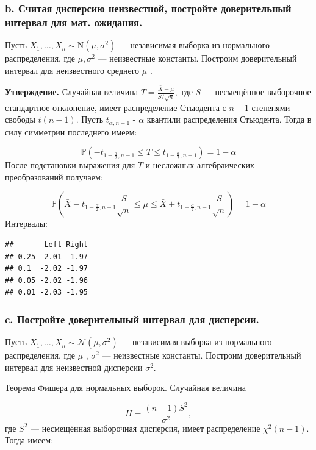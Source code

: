 \documentclass[]{article}
\begin{document}
\subsubsection{b. Считая дисперсию неизвестной, постройте доверительный
интервал для мат. ожидания.}\label{b.--------.-.}

Пусть \(X_{1},\ldots ,X_{n}\sim \mathrm {N} (\mu ,\sigma ^{2})\) ---
независимая выборка из нормального распределения, где
\(\mu ,\sigma ^{2}\) --- неизвестные константы. Построим доверительный
интервал для неизвестного среднего \(\mu\) .

\textbf{Утверждение.} Случайная величина
\(T={\frac {{\bar {X}}-\mu }{S/{\sqrt {n}}}},\) где \(S\) ---
несмещённое выборочное стандартное отклонение, имеет распределение
Стьюдента с \(n-1\) степенями свободы \(t(n-1)\). Пусть
\({\displaystyle t_{\alpha ,n-1}}\) - \({\displaystyle \alpha }\)
квантили распределения Стьюдента. Тогда в силу симметрии последнего
имеем:

\[\mathbb {P} \left(-t_{1-{\frac {\alpha }{2}},n-1}\leq T\leq t_{1-{\frac {\alpha }{2}},n-1}\right)=1-\alpha \]
После подстановки выражения для \(T\) и несложных алгебраических
преобразований получаем:

\[\mathbb {P} \left({\bar {X}}-t_{1-{\frac {\alpha }{2}},n-1}{\frac {S}{\sqrt {n}}}\leq \mu \leq {\bar {X}}+t_{1-{\frac {\alpha }{2}},n-1}{\frac {S}{\sqrt {n}}}\right)=1-\alpha\]
Интервалы:

\begin{verbatim}
##       Left Right
## 0.25 -2.01 -1.97
## 0.1  -2.02 -1.97
## 0.05 -2.02 -1.96
## 0.01 -2.03 -1.95
\end{verbatim}

\subsubsection{c. Постройте доверительный интервал для
дисперсии.}\label{c.-----.}

Пусть \(X_{1},\ldots ,X_{n}\sim {\mathcal {N}}(\mu ,\sigma ^{2})\) ---
независимая выборка из нормального распределения, где \(\mu\) ,
\(\sigma ^{2}\) --- неизвестные константы. Построим доверительный
интервал для неизвестной дисперсии \(\sigma ^{2}\).

Теорема Фишера для нормальных выборок. Случайная величина

\[H={\frac {(n-1)S^{2}}{\sigma ^{2}}},\] где \(S^{2}\) --- несмещённая
выборочная дисперсия, имеет распределение \(\chi ^{2}(n-1)\). Тогда
имеем:
\end{document}
